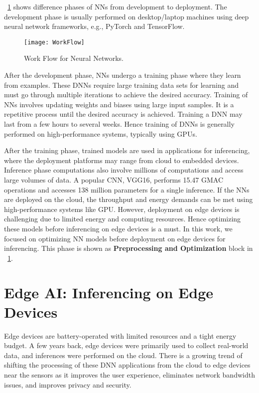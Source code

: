\figurename{~\ref{fig:workFlow}} shows difference phases of NNs from development to deployment. The development phase is usually performed on desktop/laptop machines using deep neural network frameworks, e.g., PyTorch and TensorFlow. 
\begin{figure}[!htb]
	\centering
	\captionsetup{font=sf}
	\texttt{[image: WorkFlow]}
	\caption{Work Flow for Neural Networks.}
	\label{fig:workFlow}
\end{figure}
After the development phase, NNs undergo a training phase where they learn from examples. These DNNs require large training data sets for learning and must go through multiple iterations to achieve the desired accuracy. Training of NNs involves updating weights and biases using large input samples. It is a repetitive process until the desired accuracy is achieved. Training a DNN may last from a few hours to several weeks. Hence training of DNNs is generally performed on high-performance systems, typically using GPUs. 

After the training phase, trained models are used in applications for inferencing, where the deployment platforms may range from cloud to embedded devices. Inference phase computations also involve millions of computations and access large volumes of data. A popular CNN, VGG16, performs 15.47 GMAC operations and accesses 138 million parameters for a single inference. If the NNs are deployed on the cloud, the throughput and energy demands can be met using high-performance systems like GPU. However,  deployment on edge devices is challenging due to limited energy and computing resources. Hence optimizing these models before inferencing on edge devices is a must. In this work, we focused on optimizing NN models before deployment on edge devices for inferencing. This phase is shown as \textbf{Preprocessing and Optimization} block in \figurename{~\ref{fig:workFlow}}.

\section{Edge AI: Inferencing on Edge Devices}
Edge devices are battery-operated with limited resources and a tight energy budget. A few years back, edge devices were primarily used to collect real-world data, and inferences were performed on the cloud.
There is a growing trend of shifting the processing of these DNN applications from the cloud to edge devices near the sensors as it improves the user experience, eliminates network bandwidth issues, and improves privacy and security. 

